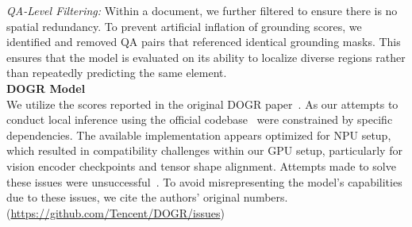 \noindent \textit{QA-Level Filtering:}
Within a document, we further filtered to ensure there is no spatial redundancy. To prevent artificial inflation of grounding scores, we identified and removed QA pairs that referenced identical grounding masks. This ensures that the model is evaluated on its ability to localize diverse regions rather than repeatedly predicting the same element.
\\
\noindent \textbf{DOGR Model \\}
We utilize the scores reported in the original DOGR paper~\cite{zhou2025dogr}. As our attempts to conduct local inference using the official codebase~\cite{zhou2025dogr_repo} were constrained by specific dependencies. The available implementation appears optimized for NPU setup, which resulted in compatibility challenges within our GPU setup, particularly for vision encoder checkpoints and tensor shape alignment. Attempts made to solve these issues were unsuccessful~\cite{zhou2025dogr_repo}. To avoid misrepresenting the model's capabilities due to these issues, we cite the authors' original numbers. 
(\url{https://github.com/Tencent/DOGR/issues})


